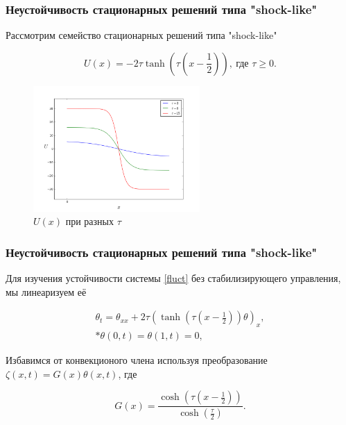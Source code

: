 \documentclass{beamer}
\begin{document}
\begin{frame}
    \frametitle{Неустойчивость стационарных решений типа "shock-like"}

    Рассмотрим семейство стационарных решений типа "shock-like"
    \begin{block}{}
        \begin{equation}\label{shock_like}
            U(x) = -2\tau\tanh{(\tau(x - \frac{1}{2}))}, \ \text{где } \tau \ge 0.
        \end{equation}
    \end{block}

    \begin{figure}[H]
        \centering
        \includegraphics[width=2.5in]{fig1}
        \caption{$U(x)$ при разных $\tau$}
    \end{figure}

\end{frame}

\begin{frame}
    \frametitle{Неустойчивость стационарных решений типа "shock-like"}

    Для изучения устойчивости системы \eqref{fluct} без стабилизирующего управления, 
    мы линеаризуем её

    \begin{block}{}
        \begin{gather}\label{linearized}
            \theta_t = \theta_{xx} + 2 \tau (\tanh(\tau(x - \frac{1}{2}))\theta)_x, \\*
            \theta(0, t) = \theta(1, t) = 0,
        \end{gather}
    \end{block}

    Избавимся от конвекционого члена используя преобразование 
    $\zeta(x, t) = G(x)\theta(x, t)$, где 

    \begin{block}{}
        \begin{equation}
            G(x) = \frac{\cosh(\tau(x - \frac{1}{2}))}{\cosh(\frac{\tau}{2})}.
        \end{equation}
    \end{block}

\end{frame}
\end{document}
